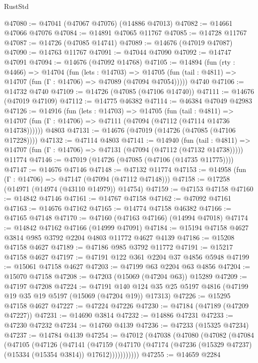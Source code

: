 \begin{lexlean}{RustStd}
\begin{coremodule}
@47080 := @47041 (@47067 @47076) (@14886 @47013)
@47082 := @14661 @47066 @47076
@47084 := @14891 @47065 @11767
@47085 := @14728 @11767
@47087 := @14726 (@47085 @14741)
@47089 := @14676 (@47019 @47087)
@47090 := @14763 @11767
@47091 := @47044 @47090
@47092 := @14747 @47091
@47094 := @14676 (@47092 @14768)
@47105 := @14894
    (fun (rty : @4466) =>
    @14704
      (fun (lets : @14703) =>
      @14705 (fun (tail : @4811) => @14707 (fun (Γ : @14706) => @47089 (@47094 @47054)))))
    @4740
@47106 := @14732 @4740
@47109 := @14726 (@47085 (@47106 @14740))
@47111 := @14676 (@47019 @47109)
@47112 := @14775 @46382
@47114 := @46384 @47049 @42983
@47126 := @14916
    (fun (lets : @14703) =>
    @14705
      (fun (tail : @4811) =>
      @14707 (fun (Γ : @14706) => @47111 (@47094 (@47112 (@47114 @14736 @14738))))))
    @4803
@47131 := @14676 (@47019 (@14726 (@47085 (@47106 @17228))))
@47132 := @47114 @4803
@47141 := @14940
    (fun (tail : @4811) => @14707 (fun (Γ : @14706) => @47131 (@47094 (@47112 (@47132 @14738)))))
    @11774
@47146 := @47019 (@14726 (@47085 (@47106 (@14735 @11775))))
@47147 := @14676 @47146
@47148 := @47132 @11774
@47153 := @14958 (fun (Γ : @14706) => @47147 (@47094 (@47112 @47148)))
@47158 := @17258 (@14971 (@14974 (@43110 @14979)) @14754)
@47159 := @47153 @47158
@47160 := @14842 @47146
@47161 := @14767 @47158
@47162 := @47092 @47161
@47163 := @14676 @47162
@47165 := @14774 @47158 @46382
@47166 := @47165 @47148
@47170 := @47160 (@47163 @47166) (@14994 @47018)
@47174 := @14842 @47162 @47166 (@14999 @47091)
@47184 := @15194 @47158 @4627 @3814 @985 @3792 @2204 @4803 @11772 @4627 @4139
@47186 := @15208 @47158 @4627
@47189 := @47186 @985 @3792 @11772
@47191 := @15217 @47158 @4627
@47197 := @47191 @122 @361 @2204 @37 @4856 @5948
@47199 := @15061 @47158 @4627
@47203 := @47199 @63 @2204 @63 @4856
@47204 := @15070 @47158
@47208 := @47203 (@15069 (@47204 @63)) @15289
@47209 := @47197 @47208
@47224 := @47191
    @140
    @124
    @35
    @25
    @5197
    @4816
    (@47199 @19 @35 @19 @5197 (@15069 (@47204 @19)) @17313)
@47226 := @15295 @47158 @4627
@47227 := @47224 @47226
@47230 := @47184 (@47189 (@47209 @47227))
@47231 := @14690 @3814
@47232 := @14886 @47231
@47233 := @47230 @47232
@47234 := @14760 @4139
@47236 := @47233 (@15325 @47234)
@47237 := @14784 @4139
@47254 := @47012
    (@47038
      (@47080
        (@47082
          (@47084
            (@47105
              (@47126
                (@47141
                  (@47159
                    (@47170
                      (@47174 (@47236 (@15329 @47237) (@15334 (@15354 @3814)) @17612)))))))))))
@47255 := @14659 @2284

\end{coremodule}
\end{lexlean}
